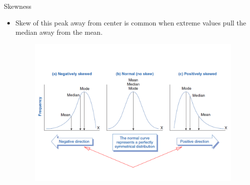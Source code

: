 \documentclass[
  ignorenonframetext,
]{beamer}
\providecommand{\tightlist}{%
  \setlength{\itemsep}{0pt}\setlength{\parskip}{0pt}}
\begin{document}
\begin{frame}{Skewness}
\label{skewness-2}
\begin{itemize}
\tightlist
\item
  Skew of this peak away from center is common when extreme values pull
  the median away from the mean.

  \begin{figure}
  \includegraphics[width=0.8\linewidth]{M4-Descriptice-Statistics_files/figure-beamer/unnamed-chunk-13-1} \end{figure}
\end{itemize}
\end{frame}
\end{document}
